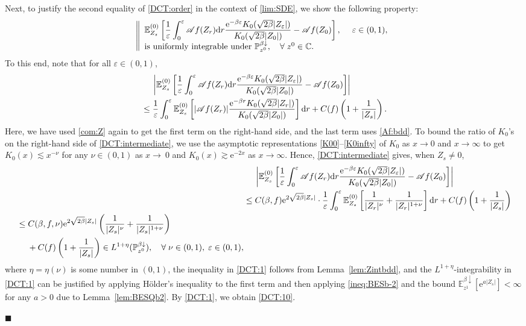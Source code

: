 \documentclass[12pt, twoside]{article}
\numberwithin{figure}{section}
\newcommand{\less}{\lesssim}
\newcommand{\more}{\gtrsim}
\newcommand{\e}{{\mathrm e}}
\newcommand{\1}{\mathds 1}
\newcommand{\vep}{{\varepsilon}}
\newcommand{\da}{{\downarrow}}
\newcommand{\ms}{\mathscr}
\renewcommand{\P}{{\mathbb P}}
\newcommand{\E}{{\mathbb E}}
\renewcommand{\d}{{\mathrm d}}
\newcommand{\2}{{\mathbf 1}}
\renewenvironment{proof}[1][\proofname]{\noindent {\bfseries #1.}\;}{\hfill\ensuremath{\blacksquare}\\}
\begin{document}
\begin{proof}[Proof of Proposition~\ref{prop:step2}]
Next, to justify the second equality of \eqref{DCT:order} in the context of \eqref{lim:SDE}, we show the following property:
\begin{align}\label{DCT:10}
\left\|
\begin{array}{ll}
\displaystyle \E_{Z_s}^{(0)}\left[\frac{1}{\vep}\int_0^\vep \ms A f(Z_r)\d r\frac{\e^{-\beta\vep}K_0(\sqrt{2\beta}|Z_\vep|)}{K_0(\sqrt{2\beta}|Z_0|)}-\ms Af(Z_0)\right],\quad \;\vep\in (0,1),\\
\vspace{-.4cm}\\
\mbox{is uniformly integrable under }\P^{\beta\da}_{z^0},\quad \forall\;z^0\in \Bbb C.
\end{array}
\right.
\end{align}
To this end, note that for all $\vep\in (0,1)$,
\begin{align}
&\quad\;\left|\E_{Z_s}^{(0)}\left[\frac{1}{\vep}\int_0^\vep \ms A f(Z_r)\d r\frac{\e^{-\beta\vep}K_0(\sqrt{2\beta}|Z_\vep|)}{K_0(\sqrt{2\beta}|Z_0|)}-\ms Af(Z_0)\right]\right|\notag\\
&\leq \frac{1}{\vep}\int_0^\vep \E_{Z_s}^{(0)}\left[|\ms Af(Z_r)|\frac{\e^{-\beta r}K_0(\sqrt{2\beta}|Z_r|)}{K_0(\sqrt{2\beta}|Z_0|)}\right]\d r+C(f)\left(1+\frac{1}{|Z_s|}\right).\label{DCT:intermediate}
\end{align}
Here, we have used \eqref{com:Z} again to get the first term on the right-hand side, and the last term uses \eqref{Af:bdd}.
To bound the ratio of $K_0$'s on the right-hand side of \eqref{DCT:intermediate}, we use the asymptotic representations \eqref{K00}--\eqref{K0infty} of $K_0$ as $x\to 0$ and $x\to\infty$ to get $K_0(x)\less x^{-\nu}$ for any $\nu\in (0,1)$ as $x\to\ 0$ and
 $K_0(x)\more \e^{-2x}$ as $x\to\infty$. Hence, 
\eqref{DCT:intermediate} gives, when $Z_s\neq 0$,
\begin{align}
&\quad\;\left|\E_{Z_s}^{(0)}\left[\frac{1}{\vep}\int_0^\vep \ms A f(Z_r)\d r\frac{\e^{-\beta\vep}K_0(\sqrt{2\beta}|Z_\vep|)}{K_0(\sqrt{2\beta}|Z_0|)}-\ms Af(Z_0)\right]\right|\notag\\
&\leq C(\beta,f)\e^{2\sqrt{2\beta}|Z_s|}\cdot \frac{1}{\vep}\int_0^\vep \E_{Z_s}^{(0)}\left[\frac{1}{|Z_r|^{\nu}}+\frac{1}{|Z_r|^{1+\nu}}\right]\d r+C(f)\left(1+\frac{1}{|Z_s|}\right)\notag\\
\begin{split}
&\leq C(\beta,f,\nu)\e^{2\sqrt{2\beta}|Z_s|}\left(\frac{1}{|Z_s|^{\nu}}+\frac{1}{|Z_s|^{1+\nu}}\right)\\
&\quad\;+C(f)\left(1+\frac{1}{|Z_s|}\right)\in L^{1+\eta}(\P^{\beta\da}_{z^0}),\quad \forall\;\nu\in (0,1),\;\vep\in (0,1),\label{DCT:1}
\end{split}
\end{align}
where $\eta=\eta(\nu)$ is some number in $ (0,1)$, the inequality in \eqref{DCT:1} follows from Lemma~\ref{lem:Zintbdd}, and the $L^{1+\eta}$-integrability in \eqref{DCT:1} can be justified by applying H\"older's inequality to the first term and then applying 
\eqref{ineq:BESb-2} and the bound $\E_{z^1}^{\beta\da}[\e^{a|Z_s|}]<\infty$ for any $a>0$ due to Lemma~\ref{lem:BESQb2}. By \eqref{DCT:1}, we obtain \eqref{DCT:10}.


\end{proof}
\end{document}
